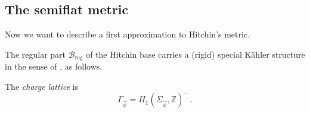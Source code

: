\documentclass[12pt,letterpaper,reqno]{article}
\numberwithin{equation}{section}
\newcommand{\cB}{\ensuremath{\mathcal B}}
\newcommand{\cM}{\ensuremath{\mathcal M}}
\newcommand{\bbZ}{\ensuremath{\mathbb Z}}
\newcommand{\kahler}{K\"ahler\xspace}
\newcommand{\hk}{hyperk\"ahler\xspace}
\newcommand{\reg}{\mathrm{reg}}
\newcommand{\vphi}{{\vec\phi}}
\newcommand{\ti}[1]{\textit{#1}}
\DeclareMathOperator{\Tr}{Tr}
\newcommand{\fixme}[1]{{\color{orange}{[#1]}}}
\begin{document}








\subsection{The semiflat metric}

Now we want to describe a first approximation to Hitchin's metric.

The regular part $\cB_\reg$ of the Hitchin base 
carries a (rigid) special \kahler structure 
in the sense of \cite{Freed:1997dp}, as follows.

\begin{defn}
The \ti{charge lattice} is
\begin{equation}
    \Gamma_\vphi = H_1(\Sigma_\vphi, \bbZ)^- \, .
\end{equation}
\end{defn}
\end{document}
